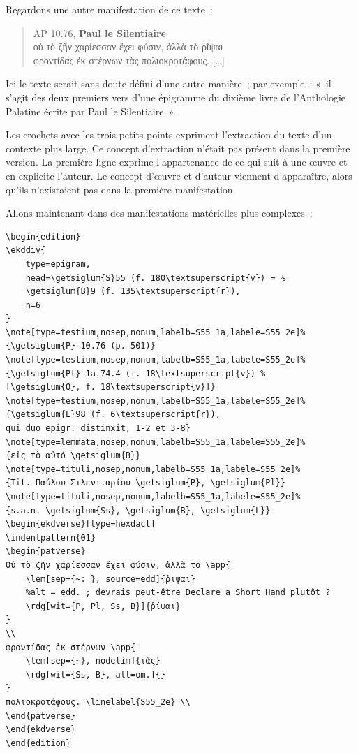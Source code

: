 Regardons une autre manifestation de ce texte~:

\begin{quote}
AP 10.76, \textbf{Paul le Silentiaire}\\
οὐ τὸ ζῆν χαρίεσσαν ἔχει φύσιν, ἀλλὰ τὸ ῥῖψαι\\
φροντίδας ἐκ στέρνων τὰς πολιοκροτάφους. {[}\ldots{]}
\end{quote}

Ici le texte serait sans doute défini d'une autre manière~; par
exemple~: «~il s'agit des deux premiers vers d'une épigramme du dixième
livre de l'Anthologie Palatine écrite par Paul le Silentiaire~».

Les crochets avec les trois petits points expriment l'extraction du
texte d'un contexte plus large. Ce concept d'extraction n'était pas
présent dans la première version. La première ligne exprime
l'appartenance de ce qui suit à une \oe uvre et en explicite l'auteur.
Le concept d'\oe uvre et d'auteur viennent d'apparaître, alors qu'ils
n'existaient pas dans la première manifestation.

Allons maintenant dans des manifestations matérielles plus complexes~:

\scriptsize

\begin{verbatim}
\begin{edition}
\ekddiv{
    type=epigram,
    head=\getsiglum{S}55 (f. 180\textsuperscript{v}) = %
    \getsiglum{B}9 (f. 135\textsuperscript{r}),
    n=6
}
\note[type=testium,nosep,nonum,labelb=S55_1a,labele=S55_2e]%
{\getsiglum{P} 10.76 (p. 501)}
\note[type=testium,nosep,nonum,labelb=S55_1a,labele=S55_2e]%
{\getsiglum{Pl} 1a.74.4 (f. 18\textsuperscript{v}) %
[\getsiglum{Q}, f. 18\textsuperscript{v}]}
\note[type=testium,nosep,nonum,labelb=S55_1a,labele=S55_2e]%
{\getsiglum{L}98 (f. 6\textsuperscript{r}), 
qui duo epigr. distinxit, 1-2 et 3-8}
\note[type=lemmata,nosep,nonum,labelb=S55_1a,labele=S55_2e]%
{εἰς τὸ αὐτό \getsiglum{B}}
\note[type=tituli,nosep,nonum,labelb=S55_1a,labele=S55_2e]%
{Tit. Παύλου Σιλεντιαρίου \getsiglum{P}, \getsiglum{Pl}}
\note[type=tituli,nosep,nonum,labelb=S55_1a,labele=S55_2e]%
{s.a.n. \getsiglum{Ss}, \getsiglum{B}, \getsiglum{L}}
\begin{ekdverse}[type=hexdact]
\indentpattern{01}
\begin{patverse}
Οὐ τὸ ζῆν χαρίεσσαν ἔχει φύσιν, ἀλλὰ τὸ \app{
    \lem[sep={~: }, source=edd]{ῥῖψαι}
    %alt = edd. ; devrais peut-être Declare a Short Hand plutôt ?
    \rdg[wit={P, Pl, Ss, B}]{ῥίψαι}
}
\\
φροντίδας ἐκ στέρνων \app{
    \lem[sep={~}, nodelim]{τὰς}
    \rdg[wit={Ss, B}, alt=om.]{}
}
πολιοκροτάφους. \linelabel{S55_2e} \\
\end{patverse}
\end{ekdverse}
\end{edition}
\end{verbatim}

